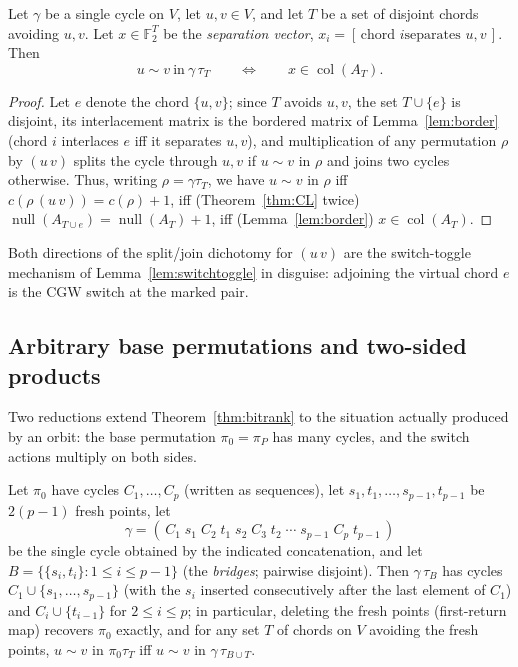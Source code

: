 \begin{theorem}
\label{thm:bitrank}
Let $\gamma$ be a single cycle on $V$, let $u,v\in V$, and let $T$ be
a set of disjoint chords avoiding $u,v$.  Let $x\in\mathbb{F}_2^{T}$
be the \emph{separation vector}, $x_i=[\,\text{chord }i\text{
separates }u,v\,]$.  Then
\[
u\sim v\ \text{in}\ \gamma\,\tau_T
\qquad\Longleftrightarrow\qquad
x\in\operatorname{col}(A_T).
\]
\end{theorem}

\begin{proof}
Let $e$ denote the chord $\{u,v\}$; since $T$ avoids $u,v$, the set
$T\cup\{e\}$ is disjoint, its interlacement matrix is the bordered
matrix of Lemma~\ref{lem:border} (chord $i$ interlaces $e$ iff it
separates $u,v$), and multiplication of any permutation $\rho$ by
$(u\,v)$ splits the cycle through $u,v$ if $u\sim v$ in $\rho$ and
joins two cycles otherwise.  Thus, writing $\rho=\gamma\tau_T$, we
have $u\sim v$ in $\rho$ iff
$c(\rho\,(u\,v))=c(\rho)+1$, iff (Theorem~\ref{thm:CL} twice)
$\operatorname{null}(A_{T\cup e})=\operatorname{null}(A_T)+1$, iff
(Lemma~\ref{lem:border}) $x\in\operatorname{col}(A_T)$.
\end{proof}

Both directions of the split/join dichotomy for $(u\,v)$ are the
switch-toggle mechanism of Lemma~\ref{lem:switchtoggle} in disguise:
adjoining the virtual chord $e$ is the CGW switch at the marked pair.

\subsection{Arbitrary base permutations and two-sided products}

Two reductions extend Theorem~\ref{thm:bitrank} to the situation
actually produced by an orbit: the base permutation $\pi_0=\pi_P$ has
many cycles, and the switch actions multiply on both sides.

\begin{lemma}\label{lem:passenger}
Let $\pi_0$ have cycles $C_1,\dots,C_p$ (written as sequences), let
$s_1,t_1,\dots,s_{p-1},t_{p-1}$ be $2(p-1)$ fresh points, let
\[
\gamma=(\,C_1\;s_1\;C_2\;t_1\;s_2\;C_3\;t_2\;\cdots\;
s_{p-1}\;C_p\;t_{p-1}\,)
\]
be the single cycle obtained by the indicated concatenation, and let
$B=\{\{s_i,t_i\}:1\le i\le p-1\}$ (the \emph{bridges}; pairwise
disjoint).  Then $\gamma\,\tau_B$ has cycles
$C_1\cup\{s_1,\dots,s_{p-1}\}$ (with the $s_i$ inserted consecutively
after the last element of $C_1$) and $C_i\cup\{t_{i-1}\}$ for $2\le
i\le p$; in particular, deleting the fresh points (first-return map)
recovers $\pi_0$ exactly, and for any set $T$ of chords on
$V$ avoiding the fresh points,
$u\sim v$ in $\pi_0\tau_T$ iff $u\sim v$ in $\gamma\,\tau_{B\cup T}$.
\end{lemma}

